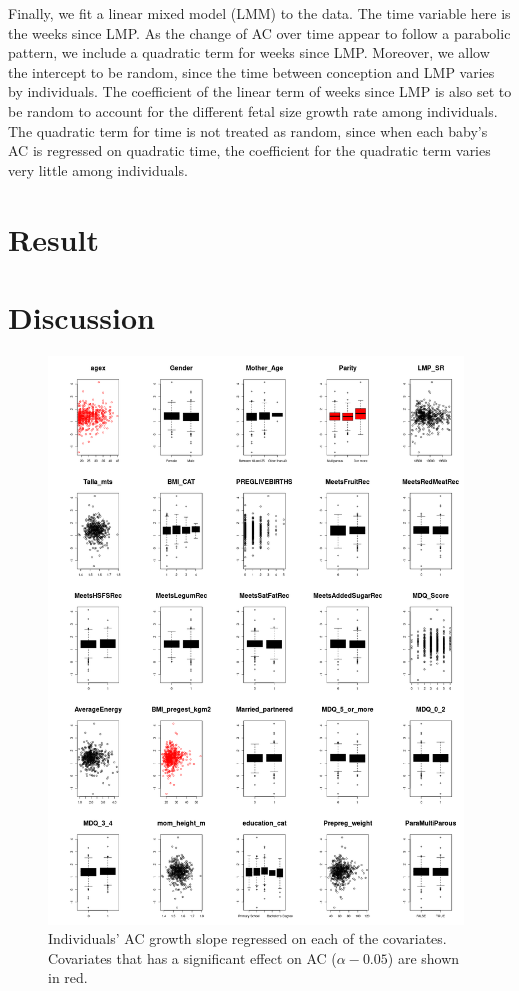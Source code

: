 \documentclass[12pt]{article}
\begin{document}
Finally, we fit a linear mixed model (LMM) to the data.
The time variable here is the weeks since LMP.
As the change of AC over time appear to follow a parabolic pattern,
we include a quadratic term for weeks since LMP.
Moreover, we allow the intercept to be random,
since the time between conception and LMP varies by individuals.
The coefficient of the linear term of weeks since LMP is also set to be random
to account for the different fetal size growth rate among individuals.
The quadratic term for time is not treated as random,
since when each baby's AC is regressed on quadratic time,
the coefficient for the quadratic term varies very little among individuals.

\section{Result}

\section{Discussion}

\newpage




\appendix

\begin{figure}[p]
  \centering
  \includegraphics[width=0.98\textwidth]{cova}
  \caption{
    Individuals' AC growth slope regressed on each of the covariates.
    Covariates that has a significant effect on AC ($\alpha - 0.05$) are shown in red.
  }
  \label{fig:cova}
\end{figure}
\end{document}
